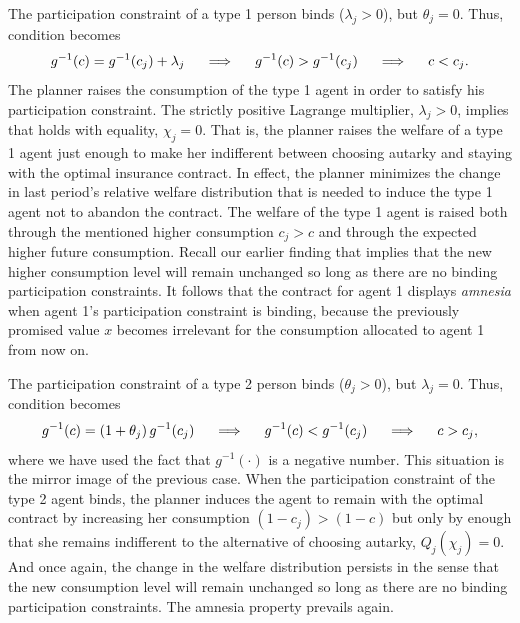 \medskip
{}   The participation constraint of a type 1 person
binds ($\lambda_j > 0$), but $\theta_j =0$. Thus,
condition  becomes
$$
g^{-1}(c) = g^{-1}(c_j) + \lambda_j  \hskip.5cm \Longrightarrow
\hskip.5cm g^{-1}(c) > g^{-1}(c_j)  \hskip.5cm \Longrightarrow
\hskip.5cm c<c_j.
$$
The planner raises the consumption of the type 1 agent in order
to satisfy his participation constraint. The strictly positive Lagrange
multiplier, $\lambda_j>0$, implies that  holds with
equality, $\chi_j=0$.  That is, the planner raises the welfare of
a type 1 agent just enough to make her indifferent between
choosing autarky and staying with the optimal insurance contract.
In effect, the planner minimizes the change in last period's
relative welfare distribution that is needed to induce the type 1
agent not to abandon the  contract. The welfare of the type 1
agent is raised both through the mentioned higher consumption
$c_j>c$ and through the expected higher future consumption. Recall
our earlier finding that implies that the new higher consumption
level will remain unchanged so long as there are no binding
participation constraints. It follows that the contract for agent
1 displays {\it amnesia\/}  when agent 1's participation
constraint is binding, because the previously promised value $x$
becomes irrelevant for the consumption allocated to agent 1 from
now on.
%




\medskip
{}   The participation constraint of a type 2 person
binds ($\theta_j > 0$), but $\lambda_j =0$. Thus,
condition  becomes
$$
g^{-1}(c) = (1+\theta_j) \,g^{-1}(c_j)  \hskip.5cm \Longrightarrow
\hskip.5cm g^{-1}(c) < g^{-1}(c_j) \hskip.5cm \Longrightarrow
\hskip.5cm c>c_j,
$$
where we have used the fact that $g^{-1}(\cdot)$ is a negative
number. This situation is the mirror image of the previous case.
When the participation constraint of the type 2 agent binds, the
planner induces the agent to remain with the optimal contract by
increasing her consumption $(1-c_j)>(1-c)$ but only by enough that
she remains indifferent to the alternative of choosing autarky,
$Q_j(\chi_j)=0$. And once again, the change in the welfare
distribution  persists in the sense that the new consumption level
will remain unchanged so long as there are no binding
participation constraints.  The amnesia property prevails again.


